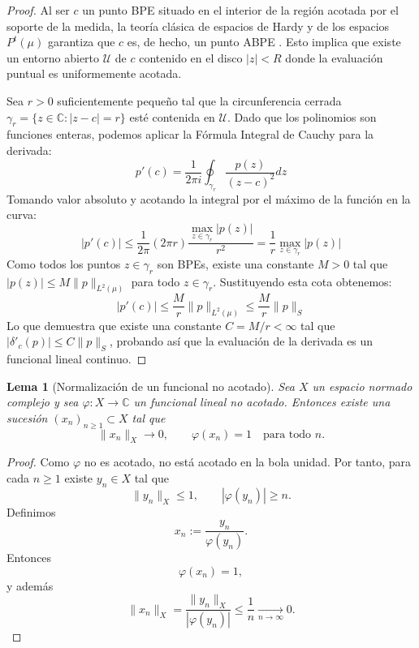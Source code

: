 \documentclass[12pt,a4paper]{article}
\newtheorem{lemma}{Lema}
\theoremstyle{definition}
\theoremstyle{remark}
\begin{document}
\begin{proof}
	Al ser $c$ un punto BPE situado en el interior de la región acotada por el soporte de la medida, la teoría clásica de espacios de Hardy y de los espacios $P^t(\mu)$ garantiza que $c$ es, de hecho, un punto ABPE \cite{miller1999bounded,aleman2009nontangential}. Esto implica que existe un entorno abierto $\mathcal{U}$ de $c$ contenido en el disco $|z| < R$ donde la evaluación puntual es uniformemente acotada.

	Sea $r > 0$ suficientemente pequeño tal que la circunferencia cerrada $\gamma_r = \{z \in \mathbb{C} : |z-c| = r\}$ esté contenida en $\mathcal{U}$. Dado que los polinomios son funciones enteras, podemos aplicar la Fórmula Integral de Cauchy para la derivada:
	\[
		p'(c) = \frac{1}{2\pi i} \oint_{\gamma_r} \frac{p(z)}{(z-c)^2} dz
	\]
	Tomando valor absoluto y acotando la integral por el máximo de la función en la curva:
	\[
		|p'(c)| \le \frac{1}{2\pi} \left( 2\pi r \right) \frac{\max_{z \in \gamma_r} |p(z)|}{r^2} = \frac{1}{r} \max_{z \in \gamma_r} |p(z)|
	\]
	Como todos los puntos $z \in \gamma_r$ son BPEs, existe una constante $M > 0$ tal que $|p(z)| \le M \|p\|_{L^2(\mu)}$ para todo $z \in \gamma_r$. Sustituyendo esta cota obtenemos:
	\[
		|p'(c)| \le \frac{M}{r} \|p\|_{L^2(\mu)} \le \frac{M}{r} \|p\|_S
	\]
	Lo que demuestra que existe una constante $C = M/r < \infty$ tal que $|\delta'_c(p)| \le C \|p\|_S$, probando así que la evaluación de la derivada es un funcional lineal continuo.
\end{proof}

\begin{lemma}[Normalización de un funcional no acotado]\label{lem:normalizacion_funcional_no_acotado}
	Sea $X$ un espacio normado complejo y sea $\varphi:X\to\mathbb C$ un funcional lineal no acotado.
	Entonces existe una sucesión $(x_n)_{n\ge1}\subset X$ tal que
	\[
		\|x_n\|_X\to 0,
		\qquad
		\varphi(x_n)=1
		\quad \text{para todo } n.
	\]
\end{lemma}

\begin{proof}
	Como $\varphi$ no es acotado, no está acotado en la bola unidad. Por tanto, para cada
	$n\ge1$ existe $y_n\in X$ tal que
	\[
		\|y_n\|_X\le 1,
		\qquad
		|\varphi(y_n)|\ge n.
	\]
	Definimos
	\[
		x_n:=\frac{y_n}{\varphi(y_n)}.
	\]
	Entonces
	\[
		\varphi(x_n)=1,
	\]
	y además
	\[
		\|x_n\|_X
		=
		\frac{\|y_n\|_X}{|\varphi(y_n)|}
		\le
		\frac1n
		\xrightarrow[n\to\infty]{}0.
	\]
\end{proof}
\end{document}

